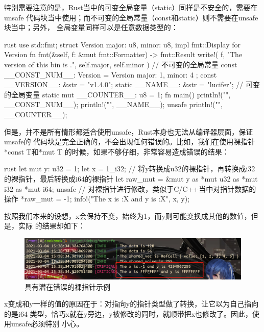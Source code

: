 特别需要注意的是，Rust当中的可变全局变量（static）同样是不安全的，需要在unsafe
代码块当中使用；而不可变的全局常量（const和static）则不需要在unsafe块当中；另外，
全局变量同样可以是任意数据类型的：
\begin{code-block}{rust}
use std::fmt;
struct Version {
    major: u8,
    minor: u8,
}
impl fmt::Display for Version {
    fn fmt(&self, f: &mut fmt::Formatter) -> fmt::Result {
        write!(
            f,
            "The version of this bin is {}.{}",
            self.major, self.minor
        )
    }
}
// 不可变的全局常量
const __CONST_NUM__: Version = Version { major: 1, minor: 4 };
const __VERSION__: &str = "v1.4.0";
static __NAME__: &str = "lucifer";
// 可变的全局变量
static mut __COUNTER__: u8 = 1;
fn main() {
    println!("{}", __CONST_NUM__);
    println!("{}", __NAME__);
    unsafe {
        println!("{}", __COUNTER__);
    }
}
\end{code-block}

但是，并不是所有情形都适合使用unsafe，Rust本身也无法从编译器层面，保证unsafe的
代码块是完全正确的，不会出现任何错误的。比如，我们在使用裸指针*const T和*mut T
的时候，如果不够仔细，非常容易造成错误的结果：
\begin{code-block}{rust}
let mut y: u32 = 1;
let x = 1_i32;
// 将y转换成u32的裸指针，再转换成i32的裸指针，最后转换成i64的裸指针
let raw_mut = &mut y as *mut u32 as *mut i32 as *mut i64;
unsafe {
    // 对裸指针进行修改，类似于C/C++当中对指针数据的操作
    *raw_mut = -1;
}
info!("The x is {:X} and y is {:X}", x, y);
\end{code-block}
按照我们本来的设想，x会保持不变，始终为1，而y则可能变换成其他的数值，但是，实际
的结果却如下：
\begin{figure}[H]
  \centering
  \includegraphics[width=\linewidth]{rust_raw_pointer.png}
  \caption{具有潜在错误的裸指针示例}
  \label{fig:rust_raw_pointer}
\end{figure}
x变成和y一样的值的原因在于：对指向y的指针类型做了转换，让它以为自己指向的是i64
类型，恰巧x就在y旁边，y被修改的同时，就顺带把x也修改了。因此，使用unsafe必须特别
小心。

